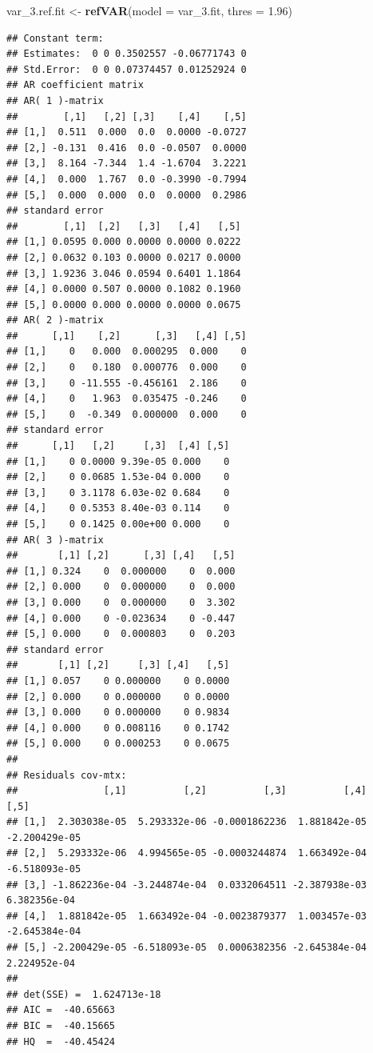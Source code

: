 \documentclass[12pt,a4paper]{article}
\newenvironment{Shaded}{\begin{snugshade}}{\end{snugshade}}
\newcommand{\DataTypeTok}[1]{\textcolor[rgb]{0.13,0.29,0.53}{#1}}
\newcommand{\FloatTok}[1]{\textcolor[rgb]{0.00,0.00,0.81}{#1}}
\newcommand{\KeywordTok}[1]{\textcolor[rgb]{0.13,0.29,0.53}{\textbf{#1}}}
\newcommand{\NormalTok}[1]{#1}
\newcommand{\StringTok}[1]{\textcolor[rgb]{0.31,0.60,0.02}{#1}}
\begin{document}
\begin{Shaded}
\begin{Highlighting}[]
\NormalTok{var_}\FloatTok{3.}\NormalTok{ref.fit <-}\StringTok{ }\KeywordTok{refVAR}\NormalTok{(}\DataTypeTok{model =}\NormalTok{ var_}\FloatTok{3.}\NormalTok{fit, }\DataTypeTok{thres =} \FloatTok{1.96}\NormalTok{)}
\end{Highlighting}
\end{Shaded}

\begin{verbatim}
## Constant term: 
## Estimates:  0 0 0.3502557 -0.06771743 0 
## Std.Error:  0 0 0.07374457 0.01252924 0 
## AR coefficient matrix 
## AR( 1 )-matrix 
##        [,1]   [,2] [,3]    [,4]    [,5]
## [1,]  0.511  0.000  0.0  0.0000 -0.0727
## [2,] -0.131  0.416  0.0 -0.0507  0.0000
## [3,]  8.164 -7.344  1.4 -1.6704  3.2221
## [4,]  0.000  1.767  0.0 -0.3990 -0.7994
## [5,]  0.000  0.000  0.0  0.0000  0.2986
## standard error 
##        [,1]  [,2]   [,3]   [,4]   [,5]
## [1,] 0.0595 0.000 0.0000 0.0000 0.0222
## [2,] 0.0632 0.103 0.0000 0.0217 0.0000
## [3,] 1.9236 3.046 0.0594 0.6401 1.1864
## [4,] 0.0000 0.507 0.0000 0.1082 0.1960
## [5,] 0.0000 0.000 0.0000 0.0000 0.0675
## AR( 2 )-matrix 
##      [,1]    [,2]      [,3]   [,4] [,5]
## [1,]    0   0.000  0.000295  0.000    0
## [2,]    0   0.180  0.000776  0.000    0
## [3,]    0 -11.555 -0.456161  2.186    0
## [4,]    0   1.963  0.035475 -0.246    0
## [5,]    0  -0.349  0.000000  0.000    0
## standard error 
##      [,1]   [,2]     [,3]  [,4] [,5]
## [1,]    0 0.0000 9.39e-05 0.000    0
## [2,]    0 0.0685 1.53e-04 0.000    0
## [3,]    0 3.1178 6.03e-02 0.684    0
## [4,]    0 0.5353 8.40e-03 0.114    0
## [5,]    0 0.1425 0.00e+00 0.000    0
## AR( 3 )-matrix 
##       [,1] [,2]      [,3] [,4]   [,5]
## [1,] 0.324    0  0.000000    0  0.000
## [2,] 0.000    0  0.000000    0  0.000
## [3,] 0.000    0  0.000000    0  3.302
## [4,] 0.000    0 -0.023634    0 -0.447
## [5,] 0.000    0  0.000803    0  0.203
## standard error 
##       [,1] [,2]     [,3] [,4]   [,5]
## [1,] 0.057    0 0.000000    0 0.0000
## [2,] 0.000    0 0.000000    0 0.0000
## [3,] 0.000    0 0.000000    0 0.9834
## [4,] 0.000    0 0.008116    0 0.1742
## [5,] 0.000    0 0.000253    0 0.0675
##   
## Residuals cov-mtx: 
##               [,1]          [,2]          [,3]          [,4]          [,5]
## [1,]  2.303038e-05  5.293332e-06 -0.0001862236  1.881842e-05 -2.200429e-05
## [2,]  5.293332e-06  4.994565e-05 -0.0003244874  1.663492e-04 -6.518093e-05
## [3,] -1.862236e-04 -3.244874e-04  0.0332064511 -2.387938e-03  6.382356e-04
## [4,]  1.881842e-05  1.663492e-04 -0.0023879377  1.003457e-03 -2.645384e-04
## [5,] -2.200429e-05 -6.518093e-05  0.0006382356 -2.645384e-04  2.224952e-04
##   
## det(SSE) =  1.624713e-18 
## AIC =  -40.65663 
## BIC =  -40.15665 
## HQ  =  -40.45424
\end{verbatim}
\end{document}
